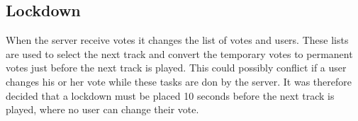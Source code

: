 \subsection{Lockdown}
When the server receive votes it changes the list of votes and users. These lists are used to select the next track and convert the temporary votes to permanent votes just before the next track is played. This could possibly conflict if a user changes his or her vote while these tasks are don by the server. It was therefore decided that a lockdown must be placed 10 seconds before the next track is played, where no user can change their vote.